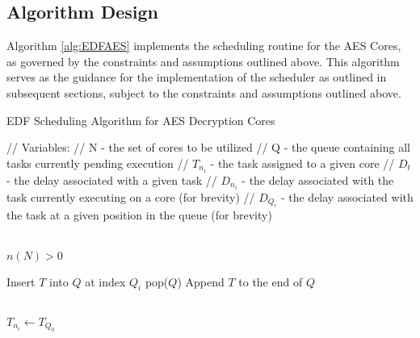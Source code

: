\subsection{Algorithm Design}\label{subsec:AlgoImpl}
Algorithm \ref{alg:EDFAES} implements the scheduling routine for the AES Cores, as governed by the constraints and assumptions outlined above. This algorithm serves as the guidance for the implementation of the scheduler as outlined in subsequent sections, subject to the constraints and assumptions outlined above.
\begin{algorithm}
    \caption{EDF Scheduling Algorithm for AES Decryption Cores}\label{alg:EDFAES}
    \begin{algorithmic}


        \State // Variables: 
        \State // N - the set of cores to be utilized
        \State // Q - the queue containing all tasks currently pending execution
        \State // $T_{n_i}$ - the task assigned to a given core
        \State // $D_t$ - the delay associated with a given task
        \State // $D_{n_i}$ - the delay associated with the task currently executing on a core (for brevity)
        \State // $D_{Q_i}$ - the delay associated with the task at a given position in the queue (for brevity)

        \\

        \Require $n(N) > 0$ 

                    \State Insert $T$ into $Q$ at index $Q_i$
                    \State \Return pop($Q$)
                \EndIf
            \EndFor
            \State Append $T$ to the end of $Q$ 
        \EndFunction

        \\

         
                        \State $T_{n_i} \gets T_{Q_0}$ 


\end{algorithmic}
\end{algorithm}

